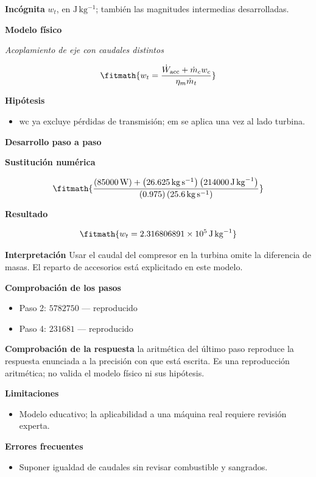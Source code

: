 \documentclass[10pt,openany]{book}
\begin{document}
\noindent\textbf{Incógnita}
$w_t$, en $\mathrm{J\,kg^{-1}}$; también las magnitudes intermedias desarrolladas.

\noindent\textbf{Modelo físico}

\noindent\textit{Acoplamiento de eje con caudales distintos}

\[
\fitmath{w_t=\frac{\dot{W}_{\mathrm{acc}} + \dot{m}_c w_c}{\eta_m \dot{m}_t}}
\]

\noindent\textbf{Hipótesis}
\begin{itemize}
\item wc ya excluye pérdidas de transmisión; em se aplica una vez al lado turbina.
\end{itemize}

\noindent\textbf{Desarrollo paso a paso}



\noindent\textbf{Sustitución numérica}

\[
\fitmath{\frac{\left(85000\,\mathrm{W}\right) + \left(26.625\,\mathrm{kg}\,\mathrm{s}^{-1}\right) \left(214000\,\mathrm{J}\,\mathrm{kg}^{-1}\right)}{\left(0.975\right) \left(25.6\,\mathrm{kg}\,\mathrm{s}^{-1}\right)}}
\]

\noindent\textbf{Resultado}

\[
\fitmath{w_t=2.316806891\times10^{5}\,\mathrm{J}\,\mathrm{kg}^{-1}}
\]

\noindent\textbf{Interpretación}
Usar el caudal del compresor en la turbina omite la diferencia de masas. El reparto de accesorios está explicitado en este modelo.

\noindent\textbf{Comprobación de los pasos}
\begin{itemize}
\item Paso 2: $5782750$ — reproducido
\item Paso 4: $231681$ — reproducido
\end{itemize}

\noindent\textbf{Comprobación de la respuesta} la aritmética del último paso reproduce la respuesta enunciada a la precisión con que está escrita. Es una reproducción aritmética; no valida el modelo físico ni sus hipótesis.

\noindent\textbf{Limitaciones}
\begin{itemize}
\item Modelo educativo; la aplicabilidad a una máquina real requiere revisión experta.
\end{itemize}

\noindent\textbf{Errores frecuentes}
\begin{itemize}
\item Suponer igualdad de caudales sin revisar combustible y sangrados.
\end{itemize}
\end{document}

